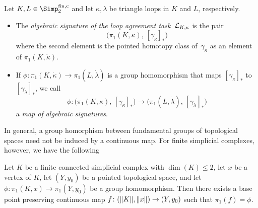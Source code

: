 \begin{thDef}
    Let $K,L\in\finSimp$ and let $\kappa,\lambda$ be triangle loops in
    $K$ and $L$, respectively.
    \begin{itemize}
        \item
            The \emph{algebraic signature %
                      of the loop agreement task~$\mathcal{L}_{K,\kappa}$}
            is the pair
            \[ \bigl( \pi_1(K,\dot\kappa), \, [\gamma_\kappa]_\ast \bigr) \]
            where the second element is the pointed homotopy class
            of~$\gamma_\kappa$ as an element of $\pi_1(K,\dot\kappa)$.
            
        \item
            If $\phi\colon\pi_1(K,\dot\kappa)\to\pi_1(L,\dot\lambda)$ is a
            group homomorphism that maps $[\gamma_\kappa]_\ast$ to
            $[\gamma_\lambda]_\ast$, we call
            \[ \phi\colon \bigl( \pi_1(K,\dot\kappa), \, [\gamma_\kappa]_\ast \bigr)
                \to \bigl( \pi_1(L,\dot\lambda), \, [\gamma_\lambda]_\ast \bigr)
            \]
            a \emph{map of algebraic signatures}.
    \end{itemize}
\end{thDef}

In general, a group homorphism between fundamental groups of topological spaces
need not be induced by a continuous map. For finite simplicial complexes,
however, we have the following

\begin{thLemma}
    \label{ch3:continuousrealization}
    Let $K$ be a finite connected simplicial complex with $\dim(K)\leq 2$, let
    $x$ be a vertex of $K$, let $(Y,y_0)$ be a pointed topological space, and
    let $\phi\colon\pi_1(K,x)\to\pi_1(Y,y_0)$ be a group homomorphism.
    Then there exists a base point preserving continuous map
    $f\colon(\lVert K\rVert,\lVert x\rVert)\to(Y,y_0)$ such that $\pi_1(f) = \phi$.
\end{thLemma}

